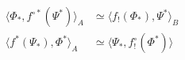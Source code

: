 \[
\boxed{\begin{aligned}
\langle\Phi_*,f^{\circ *}(\Psi^*)\rangle_A&\simeq\langle f_!(\Phi_*),\Psi^*\rangle_B\\
\langle f^*(\Psi_*),\Phi^*\rangle_A&\simeq\langle\Psi_*,f^\circ_!(\Phi^*)\rangle
\end{aligned}}
\]

